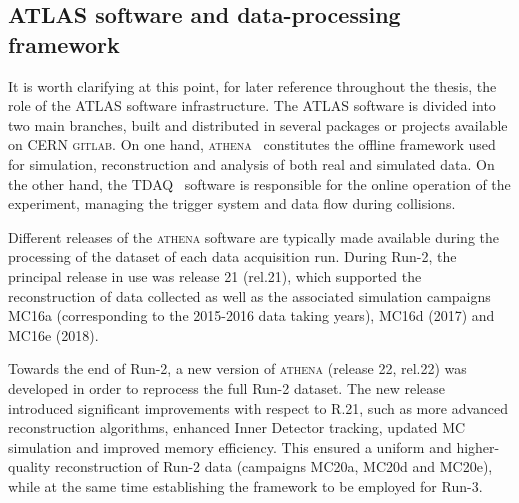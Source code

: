 
\subsection{ATLAS software and data-processing framework}
\label{sec:athena}

It is worth clarifying at this point, for later reference throughout the thesis, the role of the ATLAS software infrastructure. The ATLAS software is divided into two main branches, built and distributed in several packages or projects available on CERN \textsc{gitlab}. On one hand, \textsc{athena}~\cite{athena} constitutes the offline framework used for simulation, reconstruction and analysis of both real and simulated data. On the other hand, the TDAQ~\cite{tdaq} software is responsible for the online operation of the experiment, managing the trigger system and data flow during collisions. 

Different releases of the \textsc{athena} software are typically made available during the processing of the dataset of each data acquisition run. During Run-2, the principal release in use was release 21 (rel.21), which supported the reconstruction of data collected as well as the associated simulation campaigns MC16a (corresponding to the 2015-2016 data taking years), MC16d (2017) and MC16e (2018). 

Towards the end of Run-2, a new version of \textsc{athena} (release 22, rel.22) was developed in order to reprocess the full Run-2 dataset. The new release introduced significant improvements with respect to R.21, such as more advanced reconstruction algorithms, enhanced Inner Detector tracking, updated MC simulation and improved memory efficiency. This ensured a uniform and higher-quality reconstruction of Run-2 data (campaigns MC20a, MC20d and MC20e), while at the same time establishing the framework to be employed for Run-3.

